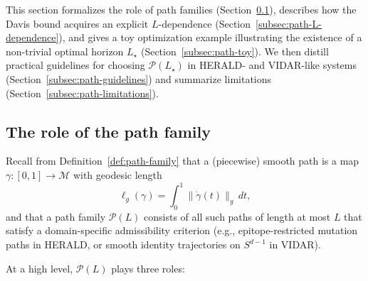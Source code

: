 \documentclass[11pt]{article}
\theoremstyle{remark}
\theoremstyle{plain}
\begin{document}
This section formalizes the role of path families (Section~\ref{subsec:path-role}), describes how the
Davis bound acquires an explicit $L$-dependence (Section~\ref{subsec:path-L-dependence}), and gives a
toy optimization example illustrating the existence of a non-trivial optimal horizon
$L_\star$ (Section~\ref{subsec:path-toy}). We then distill practical guidelines for choosing
$\mathcal{P}(L_\star)$ in HERALD- and VIDAR-like systems (Section~\ref{subsec:path-guidelines}) and
summarize limitations (Section~\ref{subsec:path-limitations}).

\subsection{The role of the path family}
\label{subsec:path-role}

Recall from Definition~\ref{def:path-family} that a (piecewise) smooth path is a map
$\gamma : [0,1] \to \mathcal{M}$ with geodesic length
\[
\ell_g(\gamma) = \int_0^1 \big\lVert \dot{\gamma}(t) \big\rVert_{g}\,dt,
\]
and that a path family $\mathcal{P}(L)$ consists of all such paths of length at most $L$ that satisfy
a domain-specific admissibility criterion (e.g., epitope-restricted mutation paths in HERALD, or
smooth identity trajectories on $S^{d-1}$ in VIDAR).

At a high level, $\mathcal{P}(L)$ plays three roles:
\end{document}
